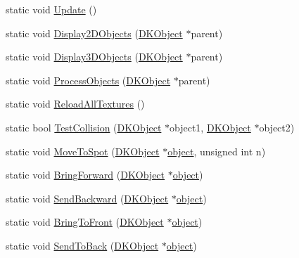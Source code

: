 \begin{DoxyCompactItemize}
\item 
static void \hyperlink{class_d_k_object_af5c9e14e04aca884c18639a0c39dfa40}{Update} ()
\item 
static void \hyperlink{class_d_k_object_a72cc33b2860d60f8e1dcd211523f187e}{Display2\-D\-Objects} (\hyperlink{class_d_k_object}{D\-K\-Object} $\ast$parent)
\item 
static void \hyperlink{class_d_k_object_a67b4280806c133c823110c2bcea87074}{Display3\-D\-Objects} (\hyperlink{class_d_k_object}{D\-K\-Object} $\ast$parent)
\item 
static void \hyperlink{class_d_k_object_a13e3462e5079026366f19b42a01b94c8}{Process\-Objects} (\hyperlink{class_d_k_object}{D\-K\-Object} $\ast$parent)
\item 
static void \hyperlink{class_d_k_object_a084f97c3adb76d5e6de2bb71508b64a5}{Reload\-All\-Textures} ()
\item 
static bool \hyperlink{class_d_k_object_a97030800350c2835b02d3e0e34bf4b78}{Test\-Collision} (\hyperlink{class_d_k_object}{D\-K\-Object} $\ast$object1, \hyperlink{class_d_k_object}{D\-K\-Object} $\ast$object2)
\item 
static void \hyperlink{class_d_k_object_a8d307eaeb92d24c164236b3582864f70}{Move\-To\-Spot} (\hyperlink{class_d_k_object}{D\-K\-Object} $\ast$\hyperlink{class_d_k_object_a1aac9df146f508fcb8f4e6a8183cc6c1}{object}, unsigned int n)
\item 
static void \hyperlink{class_d_k_object_a2929b31151139bd84537e43dcfa56887}{Bring\-Forward} (\hyperlink{class_d_k_object}{D\-K\-Object} $\ast$\hyperlink{class_d_k_object_a1aac9df146f508fcb8f4e6a8183cc6c1}{object})
\item 
static void \hyperlink{class_d_k_object_ae770259c22bf2aa035dafb57ff0a251a}{Send\-Backward} (\hyperlink{class_d_k_object}{D\-K\-Object} $\ast$\hyperlink{class_d_k_object_a1aac9df146f508fcb8f4e6a8183cc6c1}{object})
\item 
static void \hyperlink{class_d_k_object_a3ce569fe030c9bdc7e7a3e781833c0b0}{Bring\-To\-Front} (\hyperlink{class_d_k_object}{D\-K\-Object} $\ast$\hyperlink{class_d_k_object_a1aac9df146f508fcb8f4e6a8183cc6c1}{object})
\item 
static void \hyperlink{class_d_k_object_a46e39b14d4ce17b97bfbcb87cbb1031f}{Send\-To\-Back} (\hyperlink{class_d_k_object}{D\-K\-Object} $\ast$\hyperlink{class_d_k_object_a1aac9df146f508fcb8f4e6a8183cc6c1}{object})
\end{DoxyCompactItemize}
